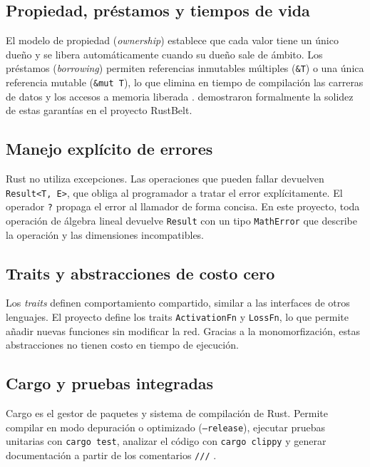 \subsection{Propiedad, préstamos y tiempos de vida}
El modelo de propiedad (\emph{ownership}) establece que cada valor tiene un único dueño y se libera automáticamente cuando su dueño sale de ámbito. Los préstamos (\emph{borrowing}) permiten referencias inmutables múltiples (\texttt{\&T}) o una única referencia mutable (\texttt{\&mut T}), lo que elimina en tiempo de compilación las carreras de datos y los accesos a memoria liberada \citep{blandy2021}. \citet{jung2018} demostraron formalmente la solidez de estas garantías en el proyecto RustBelt.

\subsection{Manejo explícito de errores}
Rust no utiliza excepciones. Las operaciones que pueden fallar devuelven \texttt{Result<T, E>}, que obliga al programador a tratar el error explícitamente. El operador \texttt{?} propaga el error al llamador de forma concisa. En este proyecto, toda operación de álgebra lineal devuelve \texttt{Result} con un tipo \texttt{MathError} que describe la operación y las dimensiones incompatibles.

\subsection{Traits y abstracciones de costo cero}
Los \emph{traits} definen comportamiento compartido, similar a las interfaces de otros lenguajes. El proyecto define los traits \texttt{ActivationFn} y \texttt{LossFn}, lo que permite añadir nuevas funciones sin modificar la red. Gracias a la monomorfización, estas abstracciones no tienen costo en tiempo de ejecución.

\subsection{Cargo y pruebas integradas}
Cargo es el gestor de paquetes y sistema de compilación de Rust. Permite compilar en modo depuración o optimizado (\texttt{--release}), ejecutar pruebas unitarias con \texttt{cargo test}, analizar el código con \texttt{cargo clippy} y generar documentación a partir de los comentarios \texttt{///} \citep{klabnik2023}.

